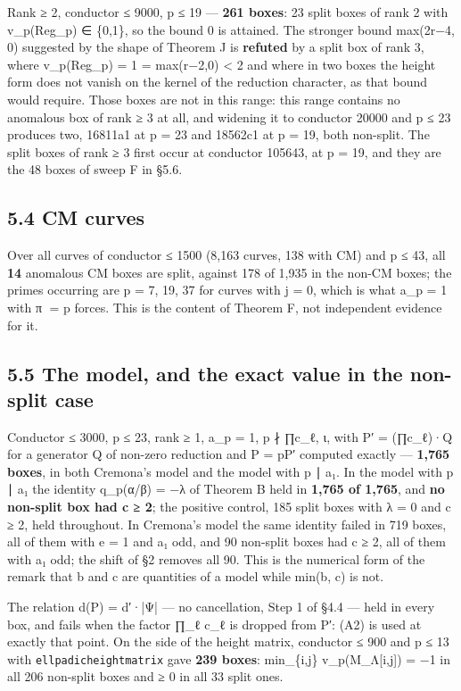 \documentclass[11pt,a4paper]{article}
\theoremstyle{named}
\begin{document}
Rank ≥ 2, conductor ≤ 9000, p ≤ 19 — \textbf{261 boxes}: 23 split boxes of rank 2 with v\_p(Reg\_p) ∈ \{0,1\}, so the bound 0 is attained. The stronger bound max(2r−4, 0) suggested by the shape of Theorem J is \textbf{refuted} by a split box of rank 3, where v\_p(Reg\_p) = 1 = max(r−2,0) \textless{} 2 and where in two boxes the height form does not vanish on the kernel of the reduction character, as that bound would require. Those boxes are not in this range: this range contains no anomalous box of rank ≥ 3 at all, and widening it to conductor 20000 and p ≤ 23 produces two, 16811a1 at p = 23 and 18562c1 at p = 19, both non-split. The split boxes of rank ≥ 3 first occur at conductor 105643, at p = 19, and they are the 48 boxes of sweep F in §5.6.

\subsection*{5.4 CM curves}

Over all curves of conductor ≤ 1500 (8,163 curves, 138 with CM) and p ≤ 43, all \textbf{14} anomalous CM boxes are split, against 178 of 1,935 in the non-CM boxes; the primes occurring are p = 7, 19, 37 for curves with j = 0, which is what a\_p = 1 with π = p forces. This is the content of Theorem F, not independent evidence for it.

\subsection*{5.5 The model, and the exact value in the non-split case}

Conductor ≤ 3000, p ≤ 23, rank ≥ 1, a\_p = 1, p ∤ ∏c\_ℓ, ι, with P′ = (∏c\_ℓ)·Q for a generator Q of non-zero reduction and P = pP′ computed exactly — \textbf{1,765 boxes}, in both Cremona's model and the model with p ∣ a₁. In the model with p ∣ a₁ the identity q\_p(α/β) = −λ of Theorem B held in \textbf{1,765 of 1,765}, and \textbf{no non-split box had c ≥ 2}; the positive control, 185 split boxes with λ = 0 and c ≥ 2, held throughout. In Cremona's model the same identity failed in 719 boxes, all of them with e = 1 and a₁ odd, and 90 non-split boxes had c ≥ 2, all of them with a₁ odd; the shift of §2 removes all 90. This is the numerical form of the remark that b and c are quantities of a model while min(b, c) is not.

The relation d(P) = d′·|Ψ| — no cancellation, Step 1 of §4.4 — held in every box, and fails when the factor ∏\_ℓ c\_ℓ is dropped from P′: (A2) is used at exactly that point. On the side of the height matrix, conductor ≤ 900 and p ≤ 13 with \texttt{ellpadicheightmatrix} gave \textbf{239 boxes}: min\_\{i,j\} v\_p(M\_Λ[i,j]) = −1 in all 206 non-split boxes and ≥ 0 in all 33 split ones.
\end{document}
